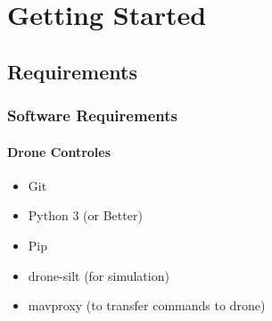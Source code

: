\chapter{Getting Started}

\section{Requirements}
\subsection{Software Requirements}
\subsubsection{Drone Controles}
\begin{itemize}
    \item Git
    \item Python 3 (or Better)
    \item Pip
    \item drone-silt (for simulation) %
    \item mavproxy (to transfer commands to drone) \cite{mavproxy}
\end{itemize}